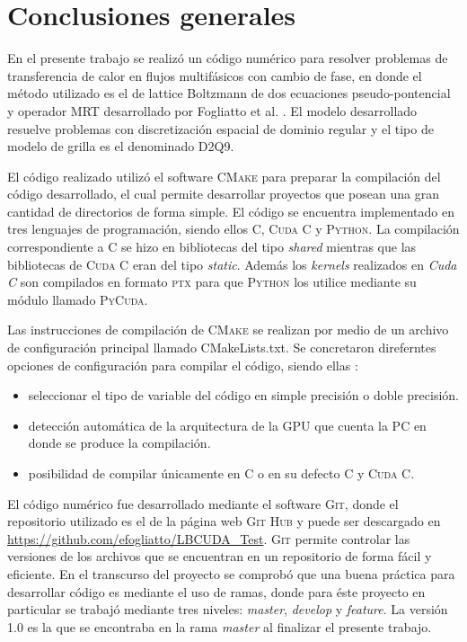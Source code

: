 \chapter{Conclusiones generales}
\graphicspath{{figs/cap4/}}
\label{cap5}

En el presente trabajo se realizó un código numérico para resolver problemas de transferencia de calor en flujos multifásicos con cambio de fase, en donde el método utilizado es el de lattice Boltzmann de dos ecuaciones pseudo-pontencial y operador MRT desarrollado por Fogliatto et al. \cite{fogliatto2019transferencia}. El modelo desarrollado resuelve problemas con discretización espacial de dominio regular y el tipo de modelo de grilla es el denominado D2Q9.

El código realizado utilizó el software \textsc{CMake} para preparar la compilación del código desarrollado, el cual permite desarrollar proyectos que posean una gran cantidad de directorios de forma simple. El código se encuentra implementado en tres lenguajes de programación, siendo ellos \textsc{C}, \textsc{Cuda C} y \textsc{Python}. La compilación correspondiente a \textsc{C} se hizo en bibliotecas del tipo \textit{shared} mientras que las bibliotecas de \textsc{Cuda C} eran del tipo \textit{static}. Además los \textit{kernels} realizados en \textit{Cuda C} son compilados en formato \textsc{ptx} para que \textsc{Python} los utilice mediante su módulo llamado \textsc{PyCuda}.

Las instrucciones de compilación de \textsc{CMake} se realizan por medio de un archivo de configuración principal llamado CMakeLists.txt. Se concretaron direferntes opciones de configuración para compilar el código, siendo ellas :

\begin{itemize}
	\item seleccionar el tipo de variable del código en simple precisión o doble precisión. 
	\item detección automática de la arquitectura de la GPU que cuenta la PC en donde se produce la compilación.
	\item posibilidad de compilar únicamente en \textsc{C} o en su defecto \textsc{C} y \textsc{Cuda C}.
\end{itemize}

El código numérico fue desarrollado mediante el software \textsc{Git}, donde el repositorio utilizado es el de la página web \textsc{Git Hub} y puede ser descargado en \url{https://github.com/efogliatto/LBCUDA_Test}. \textsc{Git} permite controlar las versiones de los archivos que se encuentran en un repositorio de forma fácil y eficiente. En el transcurso del proyecto se comprobó que una buena práctica para desarrollar código es mediante el uso de ramas, donde para éste proyecto en particular se trabajó mediante tres niveles: \textit{master}, \textit{develop} y \textit{feature}. La versión 1.0 es la que se encontraba en la rama \textit{master} al finalizar el presente trabajo.

